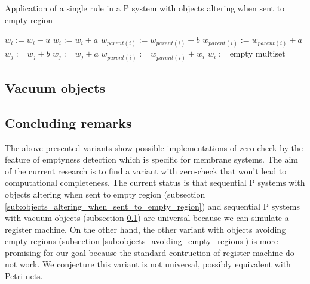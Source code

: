 \begin{algorithm}
  \caption{Application of a single rule in a P system with objects altering when sent to empty region}\label{alg:application_of_a_rule_in_a_p_system_with_objects_altering_when_sent_to_empty_region}
  \begin{algorithmic}[1]
      \State $w_i := w_i - u$
        \State $w_i := w_i + a$
      \EndFor
          \State $w_{parent(i)} := w_{parent(i)} + b$
        \Else
          \State $w_{parent(i)} := w_{parent(i)} + a$
        \EndIf
      \EndFor
          \State $w_j := w_j + b$
        \Else
          \State $w_j := w_j + a$
        \EndIf
      \EndFor
        \State $w_{parent(i)} := w_{parent(i)} + w_i$
        \State $w_i := \text{empty multiset}$
      \EndIf
    \EndProcedure
  \end{algorithmic}
\end{algorithm}


\subsection{Vacuum objects} %
\label{sub:vacuum_objects}


\subsection{Concluding remarks} %
\label{sub:concluding_remarks_of_emptyness_detection}

The above presented variants show possible implementations of zero-check by the feature of emptyness detection which is specific for membrane systems. The aim of the current research is to find a variant with zero-check that won't lead to computational completeness. The current status is that sequential P systems with objects altering when sent to empty region (subsection \ref{sub:objects_altering_when_sent_to_empty_region}) and sequential P systems with vacuum objects (subsection \ref{sub:vacuum_objects}) are universal because we can simulate a register machine. On the other hand, the other variant with objects avoiding empty regions (subsection \ref{sub:objects_avoiding_empty_regions}) is more promising for our goal because the standard contruction of register machine do not work. We conjecture this variant is not universal, possibly equivalent with Petri nets.

